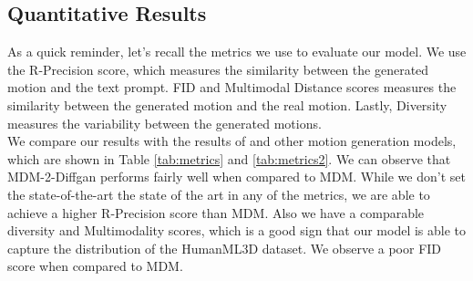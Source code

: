 \documentclass[10pt,twocolumn,letterpaper]{article}
\begin{document}
\subsection{Quantitative Results}

As a quick reminder, let's recall the metrics we use to evaluate our model. We use the R-Precision score, which measures the similarity between the generated
motion and the text prompt. FID and Multimodal Distance scores measures the similarity between the generated motion and the real motion. Lastly, Diversity 
measures the variability between the generated motions.
\\

We compare our results with the results of \cite{Tevet23} and other motion generation models, which are shown in Table \ref{tab:metrics} 
and \ref{tab:metrics2}. We can observe that MDM-2-Diffgan performs fairly well when compared to MDM. While we don't set the state-of-the-art
the state of the art in any of the metrics, we are able to achieve a higher R-Precision score than MDM. Also we have a comparable diversity and Multimodality
scores, which is a good sign that our model is able to capture the distribution of the HumanML3D dataset. We observe a poor FID score when
compared to MDM. 
\end{document}
